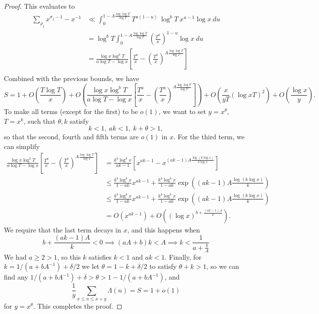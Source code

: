\begin{proof}
    This evaluates to 
    \begin{align*}
        \sum_{\rho_j} x^{\sigma_j-1} - x^{-1} & \ll \int_0^{1-A\frac{\log \log T}{\log T}} T^{a(1-u)} \ \log^b T \  x^{u-1} \log x \ du\\
        &= \log^b T \int_0^{1-A\frac{\log \log T}{\log T}} \left(\frac{T^{a}}{x}\right)^{1-u} \log x \ du\\
        &= \frac{\log x \log^{b} T}{a \log T - \log x } \left[\frac{T^a}{x}-\left(\frac{T^a}{x}\right)^{A\frac{\log \log T}{\log T}}\right]\\
    \end{align*}
    Combined with the previous bounds, we have \[
        S=1 + O\left(\frac{T\log T}{x}\right)+ O\left( \frac{\log x \log^{b} T}{a \log T - \log x } \left[\frac{T^a}{x}-\left(\frac{T^a}{x}\right)^{A\frac{\log \log T}{\log T}}\right]\right)+ O(\frac{x}{yT}(\log xT) ^2) + O(\frac{\log x}{y}) . 
    \]
    To make all terms (except for the first) to be $o(1)$, we want to set 
    $y=x^\theta$, $T=x^k$, such that $\theta,k$ satisfy \[
        k<1,\ ak<1, \ k+\theta>1, 
    \]
    so that the second, fourth and fifth terms are $o(1)$ in $x$.
    For the third term, we can simplify \begin{align*}
        \frac{\log x \log^{b} T}{a \log T - \log x } \left[\frac{T^a}{x}-\left(\frac{T^a}{x}\right)^{A\frac{\log \log T}{\log T}}\right]
        &= \frac{k^b \log^{b}x}{ak-1}  \left[x^{ak-1}-x^{(ak-1)A\frac{\log (k \log x)}{k \log x}}\right]
        \\ &\leq \frac{k^b \log^{b}x}{1-ak} x^{ak-1}  + \frac{k^b \log^{b}x}{1-ak} \exp\left((ak-1)A\frac{\log (k \log x)}{k} \right)\\
        &\leq \frac{k^b \log^{b}x}{1-ak} x^{ak-1}  + \frac{k^b \log^{b}x}{1-ak} \exp\left((ak-1)A\frac{\log (k \log x)}{k} \right)\\
        & =O(x^{ak-1})+O\left(\left(\log  x\right)^{b+\frac{(ak-1)A}{k}}\right).
    \end{align*}
    We require that the last term decays in $x$, and this happens when \[
        b+\frac{(ak-1)A}{k}< 0 \implies (aA+b)k<A \implies k < \frac{1}{a+\frac{b}{A}}
    \]
    We had $a\geq 2 >1$, so this $k$ satisfies $k<1$ and $ak<1$.
    Finally, for $k={1}/({a+bA^{-1}})+ \delta/2$ we let $\theta = 1-k+\delta/2$ to satisfy $\theta+k>1$,
    so we can find any ${1}/({a+bA^{-1}})+\delta >\theta>1-{1}/({a+bA^{-1}})$, and \[
        \frac{1}{y}\sum_{x\leq n \leq x+y} \Lambda(n) = S = 1+o(1)
    \]for $y=x^\theta$. This completes the proof.

\end{proof}
